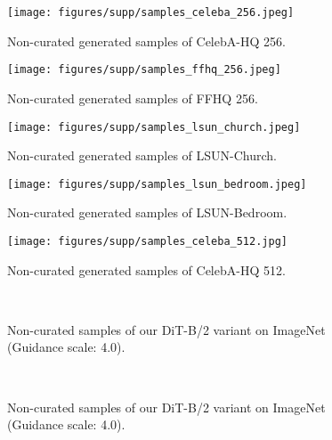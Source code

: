 \documentclass{article}
\theoremstyle{plain}
\theoremstyle{definition}
\theoremstyle{remark}
\begin{document}
\begin{figure}[t]
    \centering
    \texttt{[image: figures/supp/samples\_celeba\_256.jpeg]}
\caption{Non-curated generated samples of CelebA-HQ 256.}
    \label{fig:more_celeb_samples}
\end{figure}

\begin{figure}[t]
    \centering
    \texttt{[image: figures/supp/samples\_ffhq\_256.jpeg]}
\caption{Non-curated generated samples of FFHQ 256.}
    \label{fig:ffhq_samples}
\end{figure}

\begin{figure}[t]
    \centering
    \texttt{[image: figures/supp/samples\_lsun\_church.jpeg]}
\caption{Non-curated generated samples of LSUN-Church.}
    \label{fig:church_samples}
\end{figure}

\begin{figure}[t]
    \centering
    \texttt{[image: figures/supp/samples\_lsun\_bedroom.jpeg]}
\caption{Non-curated generated samples of LSUN-Bedroom.}
    \label{fig:bed_samples}
\end{figure}

\begin{figure}[t]
    \centering
    \texttt{[image: figures/supp/samples\_celeba\_512.jpg]}
\caption{Non-curated generated samples of CelebA-HQ 512.}
    \label{fig:celeb512_samples}
\end{figure}





\begin{figure}[t]
\centering
{}
~

\caption{Non-curated samples of our DiT-B/2 variant on ImageNet (Guidance scale: 4.0).}
    \label{fig:imnet_cfg4.0_00}
\vspace{-2mm}
\end{figure}

\begin{figure}[t]
\centering
{}
~
\caption{Non-curated samples of our DiT-B/2 variant on ImageNet (Guidance scale: 4.0).}
    \label{fig:imnet_cfg4.0_01}
\vspace{-2mm}
\end{figure}
\end{document}
